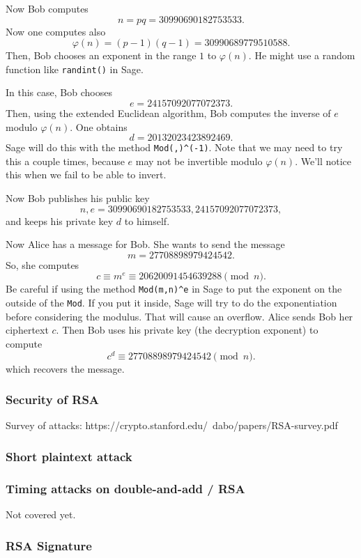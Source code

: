 \documentclass{article}
\theoremstyle{plain}
\theoremstyle{definition}
\theoremstyle{remark}
\numberwithin{theorem}{section}
\begin{document}
Now Bob computes
\[
n = pq = 30990690182753533.
\]
Now one computes also
\[
\varphi(n) = (p-1)(q-1) = 30990689779510588.
\]
Then, Bob chooses an exponent in the range $1$ to $\varphi(n)$.  He might use a random function like \texttt{randint()} in Sage.

In this case, Bob chooses
\[
e = 24157092077072373.
\]
Then, using the extended Euclidean algorithm, Bob computes the inverse of $e$ modulo $\varphi(n)$.  One obtains
\[
d = 20132023423892469.
\]
Sage will do this with the method \texttt{Mod(,)\string^(-1)}.  Note that we may need to try this a couple times, because $e$ may not be invertible modulo $\varphi(n)$.  We'll notice this when we fail to be able to invert.

Now Bob publishes his public key
\[
n,e = 30990690182753533, 24157092077072373,
\]
and keeps his private key $d$ to himself.

Now Alice has a message for Bob.  She wants to send the message 
\[
m = 27708898979424542.
\]
So, she computes
\[
c \equiv m^e \equiv 20620091454639288 \pmod n.
\]
Be careful if using the method \texttt{Mod(m,n)\string^e} in Sage to put the exponent on the outside of the \texttt{Mod}.  If you put it inside, Sage will try to do the exponentiation before considering the modulus.  That will cause an overflow.
Alice sends Bob her ciphertext $c$.  Then Bob uses his private key (the decryption exponent) to compute
\[
c^d \equiv 27708898979424542 \pmod n.
\]
which recovers the message.


\subsubsection{Security of RSA}

Survey of attacks:
https://crypto.stanford.edu/~dabo/papers/RSA-survey.pdf

\subsubsection{Short plaintext attack}

\subsubsection{Timing attacks on double-and-add / RSA}

Not covered yet.

\subsubsection{RSA Signature}
\end{document}
